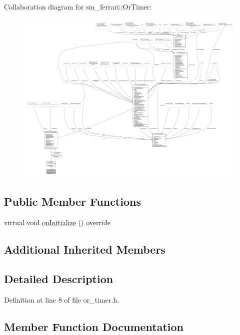 Collaboration diagram for sm\+\_\+ferrari\+:\+:Or\+Timer\+:
\nopagebreak
\begin{figure}[H]
\begin{center}
\leavevmode
\includegraphics[width=350pt]{classsm__ferrari_1_1OrTimer__coll__graph}
\end{center}
\end{figure}
\subsection*{Public Member Functions}
\begin{DoxyCompactItemize}
\item 
virtual void \hyperlink{classsm__ferrari_1_1OrTimer_a13e36fb9c67b241adb2497c43d97a8ac}{on\+Initialize} () override
\end{DoxyCompactItemize}
\subsection*{Additional Inherited Members}


\subsection{Detailed Description}


Definition at line 8 of file or\+\_\+timer.\+h.



\subsection{Member Function Documentation}
\mbox{\label{classsm__ferrari_1_1OrTimer_a13e36fb9c67b241adb2497c43d97a8ac}} 
